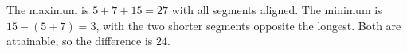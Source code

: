 The maximum is $5+7+15=27$ with all segments aligned. The minimum is $15-(5+7)=3$, with the two shorter segments opposite the longest. Both are attainable, so the difference is $\boxed{24}$.
